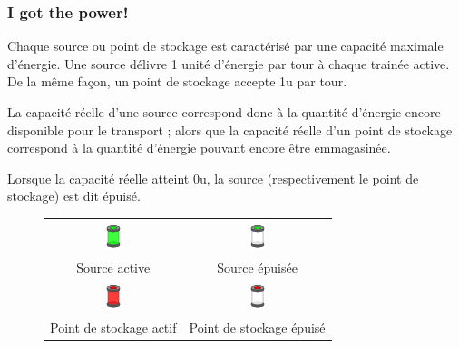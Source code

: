 \subsubsection{I got the power!}

Chaque source ou point de stockage est caractérisé par une capacité
maximale d'énergie. Une source délivre 1 unité d'énergie par tour à
chaque trainée active. De la même façon, un point de stockage accepte
1u par tour.

La capacité réelle d'une source correspond donc à la quantité
d'énergie encore disponible pour le transport ; alors que la capacité
réelle d'un point de stockage correspond à la quantité d'énergie
pouvant encore être emmagasinée.

Lorsque la capacité réelle atteint 0u, la source (respectivement le
point de stockage) est dit épuisé.\\

\begin{figure}[!h]
\centering
\begin{tabular}{c|c}
    \includegraphics{../data/graphics/source_energie-on-producteur.png}

 &

    \includegraphics{../data/graphics/source_energie-off-producteur.png}
\\
        Source active & Source épuisée \\ \hline

    \includegraphics{../data/graphics/source_energie-on-consommateur.png}

&

    \includegraphics{../data/graphics/source_energie-off-consommateur.png}
\\
        Point de stockage actif & Point de stockage épuisé

\end{tabular}
\end{figure}

